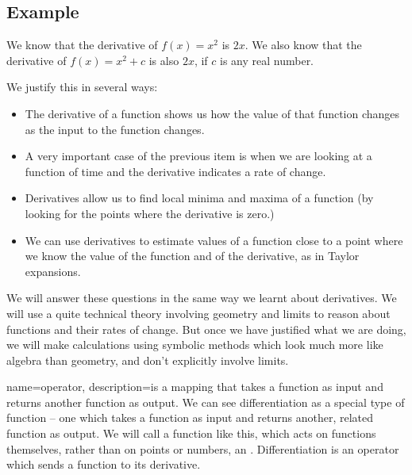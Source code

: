 \subsection{Example}
We know that the derivative of $f(x) = x^2$ is $2x$. We also know that the derivative of $f(x) = x^2 + c$ is also $2x$, if $c$ is any real number. 

 We justify this in several ways:
\begin{itemize}
\item The derivative of a function shows us how the value of that function changes as the input to the function changes. 
\item A very important case of the previous item is when we are looking at a function of time and the derivative indicates a rate of change.
\item Derivatives allow us to find local minima and maxima of a function (by looking for the points where the derivative is zero.)
\item We can use derivatives to estimate values of a function close to a point where we know the value of the function and of the derivative, as in Taylor expansions.
\end{itemize}

We will answer these questions in the same way we learnt about derivatives. We will use a quite technical theory involving geometry and limits to reason about functions and their rates of change. But once we have justified what we are doing, we will make calculations using symbolic methods which look much more like algebra than geometry, and don't explicitly involve limits.

{
	name=operator,
	description={is a mapping that takes a function as input and returns another function as output.}
}
We can see differentiation as a special type of function -- one which takes a function as input and returns another, related function as output. We will call a function like this, which acts on functions themselves, rather than on points or numbers, an . Differentiation is an operator which sends a function to its derivative. 
